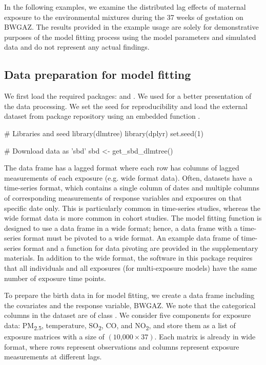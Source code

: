 In the following examples, we examine the distributed lag effects of maternal exposure to the environmental mixtures during the 37 weeks of gestation on BWGAZ. The results provided in the example usage are solely for demonstrative purposes of the model fitting process using the model parameters and simulated data and do not represent any actual findings.

\subsection{Data preparation for model fitting}\label{sec:dataprep}
We first load the required packages:  and . We used  for a better presentation of the data processing. We set the seed for reproducibility and load the external dataset  from  package repository using an embedded function .

\begin{example}
# Libraries and seed
library(dlmtree)
library(dplyr)
set.seed(1)

# Download data as 'sbd'
sbd <- get_sbd_dlmtree()
\end{example}
The data frame  has a lagged format where each row has columns of lagged measurements of each exposure (e.g. wide format data). Often, datasets have a time-series format, which contains a single column of dates and multiple columns of corresponding measurements of response variables and exposures on that specific date only. This is particularly common in time-series studies, whereas the wide format data is more common in cohort studies. The model fitting function  is designed to use a data frame in a wide format; hence, a data frame with a time-series format must be pivoted to a wide format. An example data frame of time-series format and a function for data pivoting are provided in the supplementary materials. In addition to the wide format, the software in this package requires that all individuals and all exposures (for multi-exposure models) have the same number of exposure time points.

To prepare the birth data in  for model fitting, we create a data frame including the covariates and the response variable, BWGAZ. We note that the categorical columns in the dataset are of class . We consider five components for exposure data: PM\textsubscript{2.5}, temperature, SO\textsubscript{2}, CO, and NO\textsubscript{2}, and store them as a list of exposure matrices with a size of $(\text{10,000} \times 37)$. Each matrix is already in wide format, where rows represent observations and columns represent exposure measurements at different lags.

